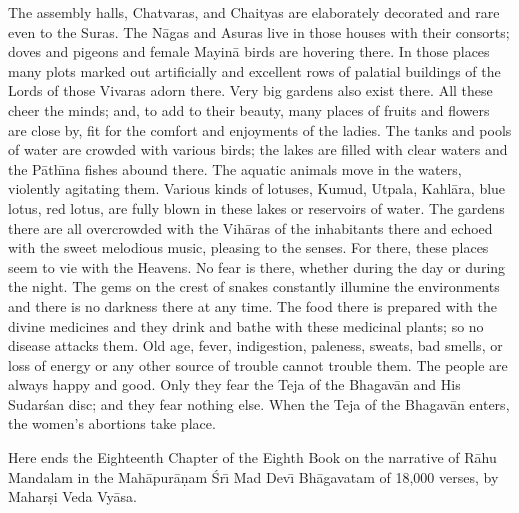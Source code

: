 The assembly halls, Chatvaras, and Chaityas are elaborately decorated and rare even to the Suras. The N\=agas and Asuras live in those houses with their consorts; doves and pigeons and female Mayin\=a birds are hovering there. In those places many plots marked out artificially and excellent rows of palatial buildings of the Lords of those Vivaras adorn there. Very big gardens also exist there. All these cheer the minds; and, to add to their beauty, many places of fruits and flowers are close by, fit for the comfort and enjoyments of the ladies. The tanks and pools of water are crowded with various birds; the lakes are filled with clear waters and the P\=ath\={\i}na fishes abound there. The aquatic animals move in the waters, violently agitating them. Various kinds of lotuses, Kumud, Utpala, Kahl\=ara, blue lotus, red lotus, are fully blown in these lakes or reservoirs of water. The gardens there are all overcrowded with the Vih\=aras of the inhabitants there and echoed with the sweet melodious music, pleasing to the senses. For there, these places seem to vie with the Heavens. No fear is there, whether during the day or during the night. The gems on the crest of snakes constantly illumine the environments and there is no darkness there at any time. The food there is prepared with the divine medicines and they drink and bathe with these medicinal plants; so no disease attacks them. Old age, fever, indigestion, paleness, sweats, bad smells, or loss of energy or any other source of trouble cannot trouble them. The people are always happy and good. Only they fear the Teja of the Bhagav\=an and His Sudar\'san disc; and they fear nothing else. When the Teja of the Bhagav\=an enters, the women's abortions take place.

Here ends the Eighteenth Chapter of the Eighth Book on the narrative of R\=ahu Mandalam in the Mah\=apur\=a\d{n}am \'Sr\={\i} Mad Dev\={\i} Bh\=agavatam of 18,000 verses, by Mahar\d{s}i Veda Vy\=asa.



